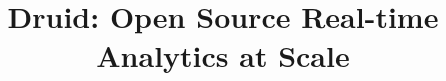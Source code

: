 \documentclass{vldb}
\begin{document}

\title{Druid: Open Source Real-time Analytics at Scale}



%
%
%
%

\end{document}
